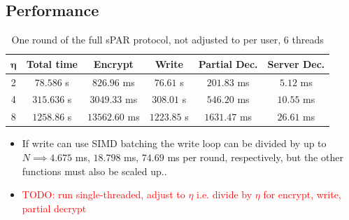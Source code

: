 \subsection{Performance}
\begin{table}[H]
    \caption{One round of the full sPAR protocol, not adjusted to per user, 6 threads}
    \label{tab:bench:full}
    \centering
    \begin{tabular}{cccccc}
        \toprule
        $\mathbf{\eta}$ & \textbf{Total time} & \textbf{Encrypt} & \textbf{Write} & \textbf{Partial Dec.} & \textbf{Server Dec.} \\
        \midrule
        2 & $78.586$ s  & $826.96$ ms   & $76.61$ s   & $201.83$ ms  & $5.12$ ms \\
        4 & $315.636$ s & $3049.33$ ms  & $308.01$ s  & $546.20$ ms  & $10.55$ ms \\
        8 & $1258.86$ s & $13562.60$ ms & $1223.85$ s & $1631.47$ ms & $26.61$ ms \\
        \bottomrule
    \end{tabular}
\end{table}

\begin{itemize}
    \item If write can use SIMD batching the write loop can be divided by up to $N \implies 4.675$ ms, $18.798$ ms, $74.69$ ms per round, respectively, but the other functions must also be scaled up.. %
    \item \textcolor{red}{TODO: run single-threaded, adjust to $\eta$ i.e. divide by $\eta$ for encrypt, write, partial decrypt}
\end{itemize}

